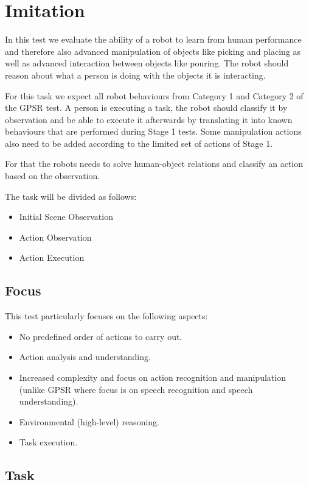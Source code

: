 \section{Imitation}

In this test we evaluate the ability of a robot to learn from human performance
and therefore also advanced manipulation of objects like picking and placing as 
well as advanced interaction between objects like pouring. The robot should 
reason about what a person is doing with the objects it is interacting.

For this task we expect all robot behaviours from Category 1 and Category 2 of
the GPSR test. A person is executing a task, the robot should classify it by observation
and be able to execute it afterwards by translating it into known behaviours that
are performed during Stage 1 tests. Some manipulation actions also need to be
added according to the limited set of actions of Stage 1.

For that the robots needs to solve human-object relations and classify an action
based on the observation.

The task will be divided as follows:

\begin{itemize}
	\item Initial Scene Observation
	\item Action Observation
	\item Action Execution
\end{itemize}


\subsection{Focus}
This test particularly focuses on the following aspects:
\begin{itemize}
	\item No predefined order of actions to carry out.
	\item Action analysis and understanding.
	\item Increased complexity and focus on action recognition and manipulation (unlike GPSR where focus is on speech recognition and speech understanding).
	\item Environmental (high-level) reasoning.
	\item Task execution.
\end{itemize}

\subsection{Task}

